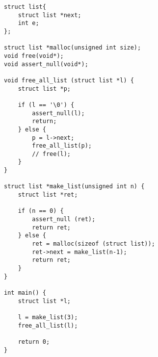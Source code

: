 \begin{lstlisting}[caption={再帰を含む構造体},label={rec_struct_unsat}]
struct list{
    struct list *next;
    int e;
};

struct list *malloc(unsigned int size);
void free(void*);
void assert_null(void*);

void free_all_list (struct list *l) {
    struct list *p;

    if (l == '\0') {
        assert_null(l);
        return;
    } else {
        p = l->next;
        free_all_list(p);
        // free(l);
    }
}

struct list *make_list(unsigned int n) {
    struct list *ret;

    if (n == 0) {
        assert_null (ret);
        return ret;
    } else {
        ret = malloc(sizeof (struct list));
        ret->next = make_list(n-1);
        return ret;
    }
}

int main() {
    struct list *l;

    l = make_list(3);
    free_all_list(l);

    return 0;
}

\end{lstlisting}